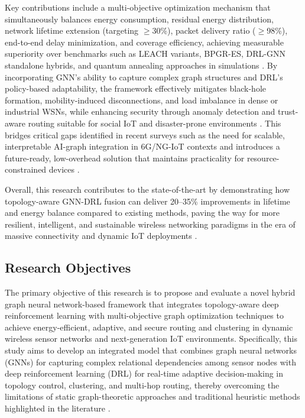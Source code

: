 \documentclass[a4paper,fleqn]{cas-dc}
\numberwithin{equation}{section}
\begin{document}
Key contributions include a multi-objective optimization mechanism that simultaneously balances energy consumption, residual energy distribution, network lifetime extension (targeting $\geq$30\%), packet delivery ratio ($\geq$98\%), end-to-end delay minimization, and coverage efficiency, achieving measurable superiority over benchmarks such as LEACH variants, BPGR-ES, DRL-GNN standalone hybrids, and quantum annealing approaches in simulations \cite{r8,r9,r2,r12}. By incorporating GNN's ability to capture complex graph structures and DRL's policy-based adaptability, the framework effectively mitigates black-hole formation, mobility-induced disconnections, and load imbalance in dense or industrial WSNs, while enhancing security through anomaly detection and trust-aware routing suitable for social IoT and disaster-prone environments \cite{r16,r22}. This bridges critical gaps identified in recent surveys such as the need for scalable, interpretable AI-graph integration in 6G/NG-IoT contexts and introduces a future-ready, low-overhead solution that maintains practicality for resource-constrained devices \cite{r27,r30}.

Overall, this research contributes to the state-of-the-art by demonstrating how topology-aware GNN-DRL fusion can deliver 20--35\% improvements in lifetime and energy balance compared to existing methods, paving the way for more resilient, intelligent, and sustainable wireless networking paradigms in the era of massive connectivity and dynamic IoT deployments \cite{r2,r19}.

\subsection{Research Objectives}

The primary objective of this research is to propose and evaluate a novel hybrid graph neural network-based framework that integrates topology-aware deep reinforcement learning with multi-objective graph optimization techniques to achieve energy-efficient, adaptive, and secure routing and clustering in dynamic wireless sensor networks and next-generation IoT environments. Specifically, this study aims to develop an integrated model that combines graph neural networks (GNNs) for capturing complex relational dependencies among sensor nodes with deep reinforcement learning (DRL) for real-time adaptive decision-making in topology control, clustering, and multi-hop routing, thereby overcoming the limitations of static graph-theoretic approaches and traditional heuristic methods highlighted in the literature \cite{r6,r29}.
\end{document}
